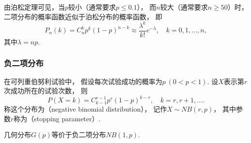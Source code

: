 由泊松定理可见，当\(p\)较小（通常要求\(p \leq 0.1\)），
而\(n\)较大（通常要求\(n \geq 50\)）时，
二项分布的概率函数近似于泊松分布的概率函数，
即\begin{equation*}
	P_n(k) = C_n^k p^k (1-p)^{n-k}
	\approx \frac{\lambda^k}{k!} e^{-\lambda},
	\quad k=0,1,\dotsc,n,
\end{equation*}
其中\(\lambda = n p\).

\subsubsection{负二项分布}
\begin{definition}
在可列重伯努利试验中，
假设每次试验成功的概率为\(p\ (0<p<1)\).
设\(X\)表示第\(r\)次成功所在的试验次数，
则\begin{equation}\label{equation:离散型分布.负二项分布的分布律}
	P(X=k) = C_{k-1}^{r-1} p^r (1-p)^{k-r},
	\quad k=r,r+1,\dotsc.
\end{equation}
称这个分布为（negative binomial distribution），
记作\(X \sim NB(r,p)\)，
其中参数\(r\)称为（stopping parameter）.
\end{definition}

几何分布\(G(p)\)等价于负二项分布\(NB(1,p)\).

